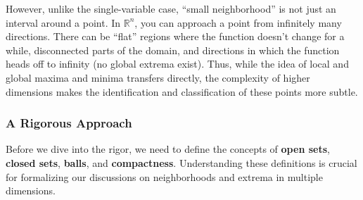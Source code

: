 \noindent However, unlike the single-variable case, ``small neighborhood” is not just an interval around a point. In \(\mathbb{R}^n\), you can approach a point from infinitely many directions. There can be ``flat” regions where the function doesn't change for a while, disconnected parts of the domain, and directions in which the function heads off to infinity (no global extrema exist). Thus, while the idea of local and global maxima and minima transfers directly, the complexity of higher dimensions makes the identification and classification of these points more subtle.

\subsubsection*{A Rigorous Approach}

Before we dive into the rigor, we need to define the concepts of \textbf{open sets}, \textbf{closed sets}, \textbf{balls}, and \textbf{compactness}. Understanding these definitions is crucial for formalizing our discussions on neighborhoods and extrema in multiple dimensions.

